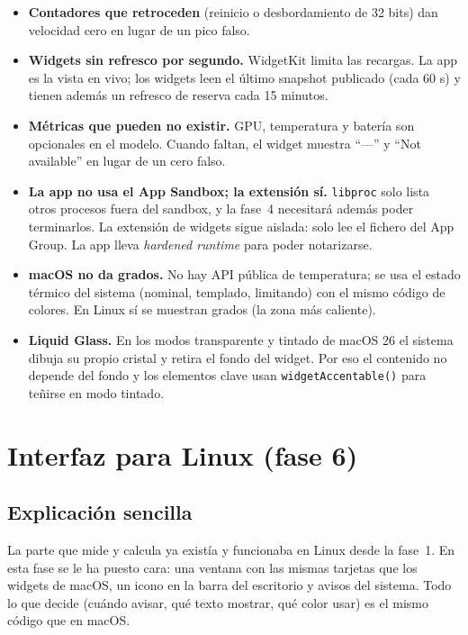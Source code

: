 \documentclass[11pt,a4paper]{article}
\begin{document}
\begin{itemize}
  \item \textbf{Contadores que retroceden} (reinicio o desbordamiento
    de 32 bits) dan velocidad cero en lugar de un pico falso.
  \item \textbf{Widgets sin refresco por segundo.} WidgetKit limita
    las recargas. La app es la vista en vivo; los widgets leen el
    último snapshot publicado (cada 60 s) y tienen además un refresco
    de reserva cada 15 minutos.
  \item \textbf{Métricas que pueden no existir.} GPU, temperatura y
    batería son opcionales en el modelo. Cuando faltan, el widget
    muestra ``—'' y ``Not available'' en lugar de un cero falso.
  \item \textbf{La app no usa el App Sandbox; la extensión sí.}
    \texttt{libproc} solo lista otros procesos fuera del sandbox, y la
    fase~4 necesitará además poder terminarlos. La extensión de
    widgets sigue aislada: solo lee el fichero del App Group. La app
    lleva \emph{hardened runtime} para poder notarizarse.
  \item \textbf{macOS no da grados.} No hay API pública de
    temperatura; se usa el estado térmico del sistema (nominal,
    templado, limitando) con el mismo código de colores. En Linux sí
    se muestran grados (la zona más caliente).
  \item \textbf{Liquid Glass.} En los modos transparente y tintado
    de macOS 26 el sistema dibuja su propio cristal y retira el fondo
    del widget. Por eso el contenido no depende del fondo y los
    elementos clave usan \texttt{widgetAccentable()} para teñirse en
    modo tintado.
\end{itemize}


\section{Interfaz para Linux (fase 6)}\label{sec:linux}
\subsection{Explicación sencilla}
La parte que mide y calcula ya existía y funcionaba en Linux desde la
fase~1. En esta fase se le ha puesto cara: una ventana con las mismas
tarjetas que los widgets de macOS, un icono en la barra del escritorio
y avisos del sistema. Todo lo que decide (cuándo avisar, qué texto
mostrar, qué color usar) es el mismo código que en macOS.
\end{document}
